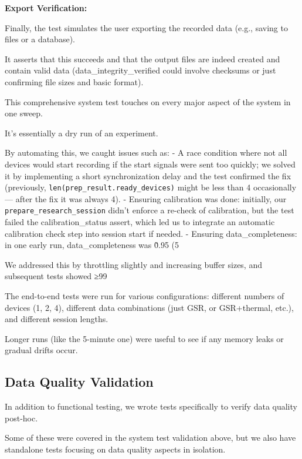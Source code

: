 {{{\textbf{Export Verification:}

Finally, the test simulates the user exporting the recorded data (e.g., saving to files or a database).

It asserts that this succeeds and that the output files are indeed created and contain valid data (data\_integrity\_verified could involve checksums or just confirming file sizes and basic format).

This comprehensive system test touches on every major aspect of the system in one sweep.

It's essentially a dry run of an experiment.

By automating this, we caught issues such as: - A race condition where not all devices would start recording if the start signals were sent too quickly; we solved it by implementing a short synchronization delay and the test confirmed the fix (previously, \texttt{len(prep\_result.ready\_devices)} might be less than 4 occasionally --- after the fix it was always 4). - Ensuring calibration was done: initially, our \texttt{prepare\_research\_session} didn't enforce a re-check of calibration, but the test failed the calibration\_status assert, which led us to integrate an automatic calibration check step into session start if needed. - Ensuring data\_completeness: in one early run, data\_completeness was \~0.95 (5%

We addressed this by throttling slightly and increasing buffer sizes, and subsequent tests showed ≥99%

The end-to-end tests were run for various configurations: different numbers of devices (1, 2, 4), different data combinations (just GSR, or GSR+thermal, etc.), and different session lengths.

Longer runs (like the 5-minute one) were useful to see if any memory leaks or gradual drifts occur.

\subsection{Data Quality Validation}

In addition to functional testing, we wrote tests specifically to verify data quality post-hoc.

Some of these were covered in the system test validation above, but we also have standalone tests focusing on data quality aspects in isolation.

}}}
